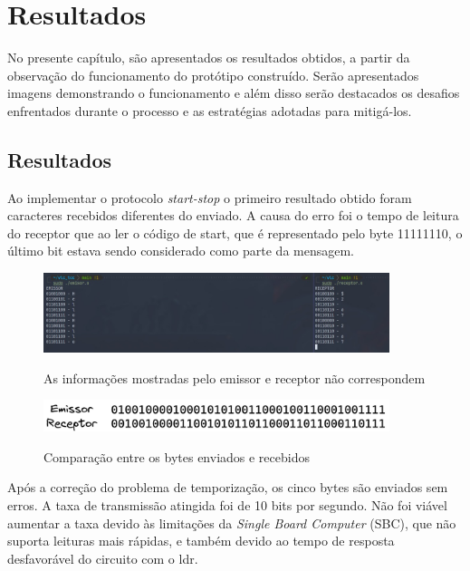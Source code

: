 \section{Resultados}

No presente capítulo, são apresentados os resultados obtidos, a partir da observação do funcionamento do protótipo construído. Serão apresentados imagens demonstrando o funcionamento e além disso serão destacados os desafios enfrentados durante o processo e as estratégias adotadas para mitigá-los.

\subsection{Resultados}

Ao implementar o protocolo \textit{start-stop} o primeiro resultado obtido foram caracteres recebidos diferentes do enviado. A causa do erro foi o tempo de leitura do receptor que ao ler o código de start, que é representado pelo byte 11111110, o último bit estava sendo considerado como parte da mensagem.

\begin{figure}[!htbp]
  \caption{As informações mostradas pelo emissor e receptor não correspondem}
  \includegraphics[width=0.9\textwidth]{images/vlc_erro_1.jpeg}
  \label{primeiro_erro}
\end{figure}

\begin{figure}[!htbp]
  \caption{Comparação entre os bytes enviados e recebidos}
  \includegraphics[width=0.9\textwidth]{images/comparacao_msg_emissor_recptor_erro.png}
  \label{comparaca_msg_emissor_recptor_erro}
\end{figure}

Após a correção do problema de temporização, os cinco bytes são enviados sem erros. A taxa de transmissão atingida foi de 10 bits por segundo. Não foi viável aumentar a taxa devido às limitações da \textit{Single Board Computer} (SBC), que não suporta leituras mais rápidas, e também devido ao tempo de resposta desfavorável do circuito com o ldr.

